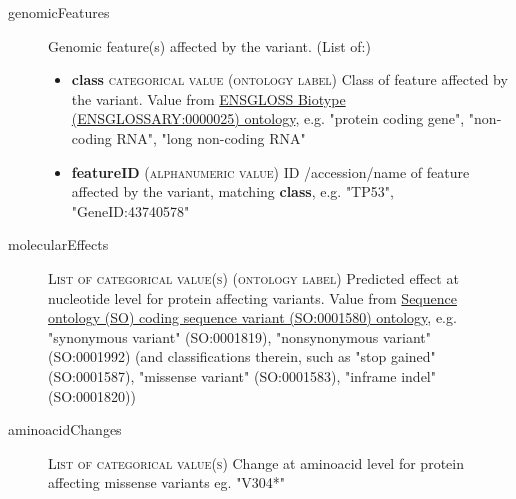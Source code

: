 \documentclass[a4paper, 10pt]{article}        %
\begin{document}
\begin{description}
	\item[genomicFeatures] Genomic feature(s) affected by the variant. (List of:)
	\begin{itemize}
			\item[]  \textbf{class} {\textsc{categorical value (ontology label)}} Class of feature affected by the variant. Value from \href{http://ensembl.org/glossary/ENSGLOSSARY_0000025}{ENSGLOSS Biotype (ENSGLOSSARY:0000025) ontology}, e.g. "protein coding gene", "non-coding RNA", "long non-coding RNA"
			\item[]  \textbf{featureID} {\textsc{(alphanumeric value)}} ID /accession/name of feature affected by the variant, matching \textbf{class}, e.g. "TP53", "GeneID:43740578"
	\end{itemize} 
	\item[molecularEffects] {\textsc{List of categorical value(s) (ontology label)}} Predicted effect at nucleotide level for protein affecting variants. Value from \href{http://purl.obolibrary.org/obo/SO_0001580}{Sequence ontology (SO) coding sequence variant (SO:0001580) ontology}, e.g. "synonymous variant" (SO:0001819), "nonsynonymous variant" (SO:0001992) (and classifications therein, such as "stop gained" (SO:0001587), "missense variant" (SO:0001583), "inframe indel" (SO:0001820))
	\item[aminoacidChanges]  {\textsc{List of categorical value(s)}} Change at aminoacid level for protein affecting missense variants eg. "V304*"
	
 \end{description}



\end{document}
